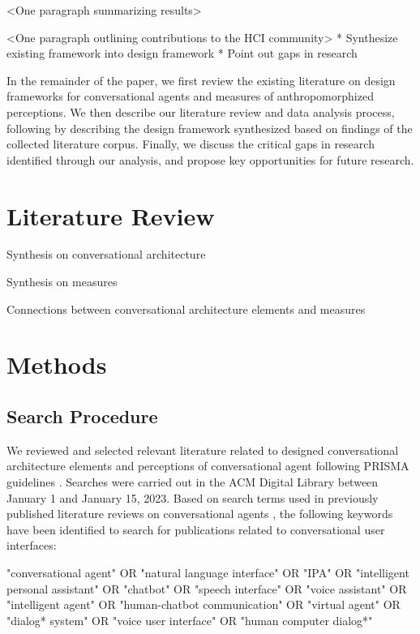 \documentclass[sigconf,screen,review, anonymous]{acmart}
\begin{document}
<One paragraph summarizing results>

<One paragraph outlining contributions to the HCI community>
* Synthesize existing framework into design framework \newline
* Point out gaps in research \newline

In the remainder of the paper, we first review the existing literature on design frameworks for conversational agents and measures of anthropomorphized perceptions. We then describe our literature review and data analysis process, following by describing the design framework synthesized based on findings of the collected literature corpus. Finally, we discuss the critical gaps in research identified through our analysis, and propose key opportunities for future research.

\section{Literature Review}

Synthesis on conversational architecture

Synthesis on measures

Connections between conversational architecture elements and measures


\section{Methods}

\subsection{Search Procedure}

We reviewed and selected relevant literature related to designed conversational architecture elements and perceptions of conversational agent following PRISMA guidelines \cite{prisma}. Searches were carried out in the ACM Digital Library between January 1 and January 15, 2023. Based on search terms used in previously published literature reviews on conversational agents \cite{clark2019state}\cite{rapp2021human} , the following keywords have been identified to search for publications related to conversational user interfaces:
\newline

\begin{mdframed}
"conversational agent" OR "natural language interface" OR "IPA" OR "intelligent personal assistant" OR "chatbot" OR "speech interface" OR "voice assistant" OR "intelligent agent" OR "human-chatbot communication" OR "virtual agent" OR "dialog* system" OR "voice user interface" OR "human computer dialog*"
\end{mdframed}
\end{document}
